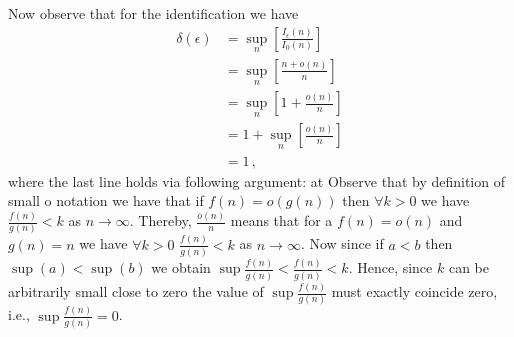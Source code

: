 Now observe that for the identification we have
\begin{align}
    \delta(\epsilon) & = \sup_n \left[ \frac{I_{\epsilon}(n)}{I_0(n)} \right]
    \nonumber\\
    & = \sup_n \left[ \frac{n + o(n)}{n} \right]
    \nonumber\\
    & = \sup_n \left[ 1 + \frac{o(n)}{n} \right]
    \nonumber\\
    & = 1 + \sup_n \left[ \frac{o(n)}{n} \right]
    \nonumber\\
    & = 1 \,,\,
\end{align}
where the last line holds via following argument: at Observe that by definition of small o notation we have that if $f(n) = o(g(n))$ then $\forall k > 0$ we have $\frac{f(n)}{g(n)} < k$ as $n \to \infty$. Thereby, $\frac{o(n)}{n}$ means that for a $f(n) = o(n)$ and $g(n) = n$ we have $\forall k > 0$ $\frac{f(n)}{g(n)} < k$ as $n \to \infty$. Now since if $a < b$ then $\sup(a) < \sup(b)$ we obtain $\sup \frac{f(n)}{g(n)} < \frac{f(n)}{g(n)} < k$. Hence, since $k$ can be arbitrarily small close to zero the value of $\sup \frac{f(n)}{g(n)}$ must exactly coincide zero, i.e., $\sup \frac{f(n)}{g(n)} = 0$.
